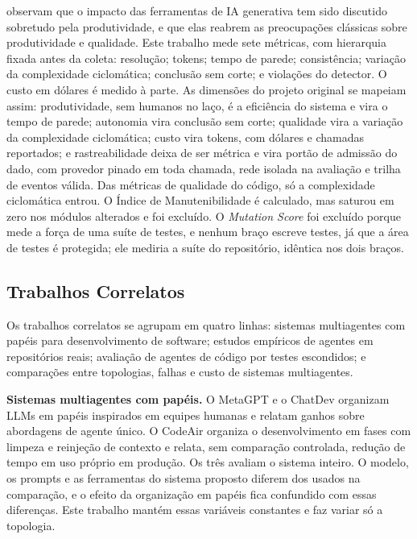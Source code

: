 \cite{GenAIAgenda2023} observam que o impacto das ferramentas de IA generativa tem sido discutido sobretudo pela produtividade, e que elas reabrem as preocupações clássicas sobre produtividade e qualidade.
Este trabalho mede sete métricas, com hierarquia fixada antes da coleta: resolução; tokens; tempo de parede; consistência; variação da complexidade ciclomática; conclusão sem corte; e violações do detector. O custo em dólares é medido à parte. As dimensões do projeto original se mapeiam assim: produtividade, sem humanos no laço, é a eficiência do sistema e vira o tempo de parede; autonomia vira conclusão sem corte; qualidade vira a variação da complexidade ciclomática; custo vira tokens, com dólares e chamadas reportados; e rastreabilidade deixa de ser métrica e vira portão de admissão do dado, com provedor pinado em toda chamada, rede isolada na avaliação e trilha de eventos válida. Das métricas de qualidade do código, só a complexidade ciclomática entrou. O Índice de Manutenibilidade é calculado, mas saturou em zero nos módulos alterados e foi excluído. O \textit{Mutation Score} foi excluído porque mede a força de uma suíte de testes, e nenhum braço escreve testes, já que a área de testes é protegida; ele mediria a suíte do repositório, idêntica nos dois braços.

\subsection{Trabalhos Correlatos}
\label{ssec:correlatos}

Os trabalhos correlatos se agrupam em quatro linhas: sistemas multiagentes com papéis para desenvolvimento de software; estudos empíricos de agentes em repositórios reais; avaliação de agentes de código por testes escondidos; e comparações entre topologias, falhas e custo de sistemas multiagentes.

\textbf{Sistemas multiagentes com papéis.} O MetaGPT \citep{MetaGPT2023} e o ChatDev \citep{ChatDev2023} organizam LLMs em papéis inspirados em equipes humanas e relatam ganhos sobre abordagens de agente único. O CodeAir \citep{CodeAir2025} organiza o desenvolvimento em fases com limpeza e reinjeção de contexto e relata, sem comparação controlada, redução de tempo em uso próprio em produção. Os três avaliam o sistema inteiro. O modelo, os prompts e as ferramentas do sistema proposto diferem dos usados na comparação, e o efeito da organização em papéis fica confundido com essas diferenças. Este trabalho mantém essas variáveis constantes e faz variar só a topologia.

